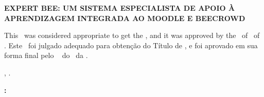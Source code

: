 


\begin{folhadeaprovacao}

    \begin{center}
        {\imprimirautor}

        \begin{center}
            \ABNTEXchapterfont\bfseries\MakeUppercase{Expert Bee: Um Sistema Especialista de Apoio à Aprendizagem Integrada ao Moodle e Beecrowd}\ifnotempty{\imprimirsubtitulo}{: \imprimirsubtitulo}
        \end{center}

        \begin{minipage}{\textwidth}
            \lang
            {
                This \imprimirtipotrabalho~was considered appropriate to get the \imprimirformacao,
                and it was approved by the \imprimirprograma~of \imprimircentro~of \imprimirinstituicao.
            }
            {
                Este \imprimirtipotrabalho~foi julgado adequado para obtenção do Título de \imprimirformacao,
                e foi aprovado em sua forma final pelo \imprimirprograma~
                do \imprimircentro~da \imprimirinstituicao.
            }
         \end{minipage}%
    \end{center}

    \begin{center}
        \imprimirlocal, \imprimirdata.
    \end{center}


    \vspace*{1cm}

    \begin{flushleft}
        \textbf{:}
    \end{flushleft}

    \vspace*{0.5cm}

    \begin{center}
        \assinatura{%
            \textbf{\imprimirorientador} \\ \imprimirorientadorRotulo\\
            \imprimirinstituicao~--~\imprimirinstituicaosigla
        }
        \vspace*{0.5cm}


\end{center}
\end{folhadeaprovacao}

